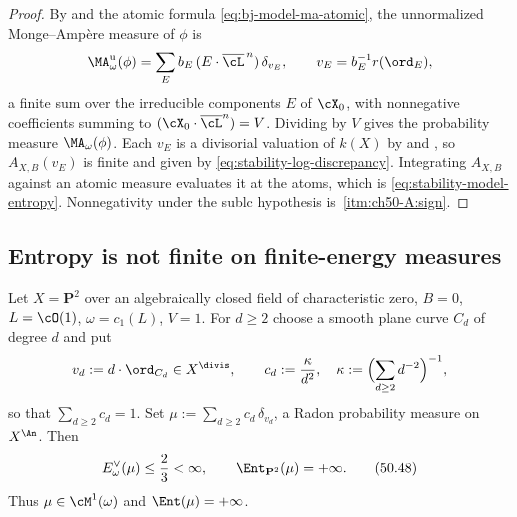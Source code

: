 \begin{proof}
By  and the atomic formula
\eqref{eq:bj-model-ma-atomic}, the unnormalized Monge--Amp\`ere measure of
$\phi$ is
\[
 \MA^{\mathrm u}_\omega(\phi)=\sum_Eb_E\,(E\cdot\overline\cL^{\,n})\,
 \delta_{v_E},\qquad v_E=b_E^{-1}r(\ord_E),
\]
a finite sum over the irreducible components $E$ of $\cX_0$, with
nonnegative coefficients summing to $(\cX_0\cdot\overline\cL^n)=V$.
Dividing by $V$ gives the probability measure $\MA_\omega(\phi)$.
Each $v_E$ is a divisorial valuation of $k(X)$ by
 and ,
so $A_{X,B}(v_E)$ is finite and given by
\eqref{eq:stability-log-discrepancy}.  Integrating $A_{X,B}$ against an
atomic measure evaluates it at the atoms, which is
\eqref{eq:stability-model-entropy}.  Nonnegativity under the sublc
hypothesis is \,\cref{itm:ch50-A:sign}.
\end{proof}

\subsection{Entropy is not finite on finite-energy measures}
\label{sec:ch50-entropy-infinite}

\begin{example}
\label{ex:ch50-infinite-entropy}
Let $X=\mathbf P^2$ over an algebraically closed field of
characteristic zero, $B=0$, $L=\cO(1)$, $\omega=c_1(L)$, $V=1$.
For $d\ge2$ choose a smooth plane curve $C_d$ of degree $d$ and put
\[
 v_d:=d\cdot\ord_{C_d}\in X^{\divis},
 \qquad
 c_d:=\frac{\kappa}{d^2},\quad
 \kappa:=\Bigl(\sum_{d\ge2}d^{-2}\Bigr)^{-1},
\]
so that $\sum_{d\ge2}c_d=1$.  Set
$\mu:=\sum_{d\ge2}c_d\,\delta_{v_d}$, a Radon probability measure on
$X^{\An}$.  Then
\[
 E^\vee_\omega(\mu)\le\frac23<\infty,
 \qquad
 \Ent_{\mathbf P^2}(\mu)=+\infty .
\tag{50.48}\label{eq:ch50-infinite-entropy}
\]
Thus $\mu\in\cM^1(\omega)$ and $\Ent(\mu)=+\infty$.
\end{example}

